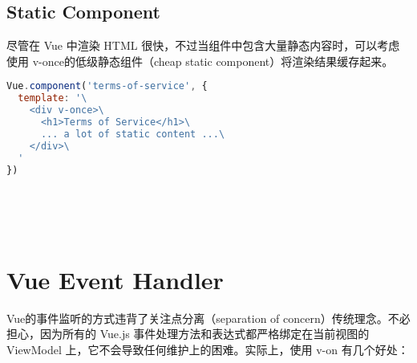 \section{Static Component}


尽管在 Vue 中渲染 HTML 很快，不过当组件中包含大量静态内容时，可以考虑使用 v-once的低级静态组件（cheap static component）将渲染结果缓存起来。



\begin{lstlisting}[language=JavaScript]
Vue.component('terms-of-service', {
  template: '\
    <div v-once>\
      <h1>Terms of Service</h1>\
      ... a lot of static content ...\
    </div>\
  '
})
\end{lstlisting}



\begin{lstlisting}[language=JavaScript]

\end{lstlisting}




\begin{lstlisting}[language=JavaScript]

\end{lstlisting}



\begin{lstlisting}[language=JavaScript]

\end{lstlisting}




\begin{lstlisting}[language=JavaScript]

\end{lstlisting}



\begin{lstlisting}[language=JavaScript]

\end{lstlisting}







\chapter{Vue Event Handler}

Vue的事件监听的方式违背了关注点分离（separation of concern）传统理念。不必担心，因为所有的 Vue.js 事件处理方法和表达式都严格绑定在当前视图的 ViewModel 上，它不会导致任何维护上的困难。实际上，使用 v-on 有几个好处：

